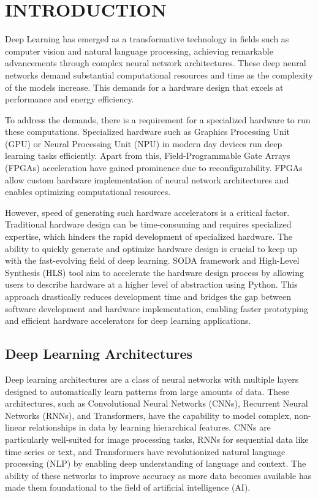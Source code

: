 \fancyhf{}
\fancyfoot[CO, CE]{ \thepage}

\chapter{INTRODUCTION}
\label{chapter1}

Deep Learning has emerged as a transformative technology in fields such as computer vision and natural language processing, achieving remarkable advancements through complex neural network architectures. These deep neural networks demand substantial computational resources and time as the complexity of the models increase. This demands for a hardware design that excels at performance and energy efficiency.

To address the demands, there is a requirement for a specialized hardware to run these computations. Specialized hardware such as Graphics Processing Unit (GPU) or Neural Processing Unit (NPU) in modern day devices run deep learning tasks efficiently. Apart from this, Field-Programmable Gate Arrays (FPGAs) acceleration have gained prominence due to reconfigurability. FPGAs allow custom hardware implementation of neural network architectures and enables optimizing computational resources.

However, speed of generating such hardware accelerators is a critical factor. Traditional hardware design can be time-consuming and requires specialized expertise, which hinders the rapid development of specialized hardware. The ability to quickly generate and optimize hardware design is crucial to keep up with the fast-evolving field of deep learning. SODA framework  \cite{BohmAgostini2022BridgingPT} and High-Level Synthesis (HLS) tool aim to accelerate the hardware design process by allowing users to describe hardware at a higher level of abstraction using Python. This approach drastically reduces development time and bridges the gap between software development and hardware implementation, enabling faster prototyping and efficient hardware accelerators for deep learning applications.

\section{Deep Learning Architectures}

Deep learning architectures are a class of neural networks with multiple layers designed to automatically learn patterns from large amounts of data. These architectures, such as Convolutional Neural Networks (CNNs), Recurrent Neural Networks (RNNs), and Transformers, have the capability to model complex, non-linear relationships in data by learning hierarchical features. CNNs are particularly well-suited for image processing tasks, RNNs for sequential data like time series or text, and Transformers have revolutionized natural language processing (NLP) by enabling deep understanding of language and context. The ability of these networks to improve accuracy as more data becomes available has made them foundational to the field of artificial intelligence (AI).

